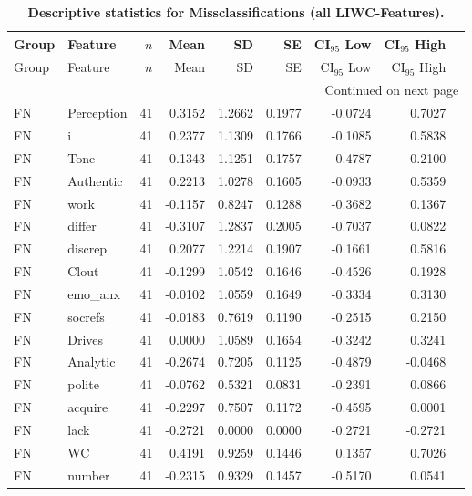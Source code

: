 
\begingroup
\scriptsize %
\setlength{\LTcapwidth}{\textwidth}
\setlength\LTleft{\fill}
\setlength\LTright{\fill}
\begin{longtable}{@{}llrrrrrrr@{}} 
\caption[Descriptive statistics for Missclassifications (all LIWC-Features)]{\textbf{Descriptive statistics for Missclassifications (all LIWC-Features).}} \label{tab:fnfp_all}\\
\toprule
Group & Feature & $n$ & Mean & SD & SE & CI$_{95}$ Low & CI$_{95}$ High \\
\midrule
\endfirsthead
\toprule
Group & Feature & $n$ & Mean & SD & SE & CI$_{95}$ Low & CI$_{95}$ High \\
\midrule
\endhead
\midrule
\multicolumn{9}{r}{{Continued on next page}} \\
\bottomrule
\endfoot
\bottomrule
\endlastfoot
FN & Perception & 41 & 0.3152 & 1.2662 & 0.1977 & -0.0724 & 0.7027 \\
FN & i & 41 & 0.2377 & 1.1309 & 0.1766 & -0.1085 & 0.5838 \\
FN & Tone & 41 & -0.1343 & 1.1251 & 0.1757 & -0.4787 & 0.2100 \\
FN & Authentic & 41 & 0.2213 & 1.0278 & 0.1605 & -0.0933 & 0.5359 \\
FN & work & 41 & -0.1157 & 0.8247 & 0.1288 & -0.3682 & 0.1367 \\
FN & differ & 41 & -0.3107 & 1.2837 & 0.2005 & -0.7037 & 0.0822 \\
FN & discrep & 41 & 0.2077 & 1.2214 & 0.1907 & -0.1661 & 0.5816 \\
FN & Clout & 41 & -0.1299 & 1.0542 & 0.1646 & -0.4526 & 0.1928 \\
FN & emo\_anx & 41 & -0.0102 & 1.0559 & 0.1649 & -0.3334 & 0.3130 \\
FN & socrefs & 41 & -0.0183 & 0.7619 & 0.1190 & -0.2515 & 0.2150 \\
FN & Drives & 41 & 0.0000 & 1.0589 & 0.1654 & -0.3242 & 0.3241 \\
FN & Analytic & 41 & -0.2674 & 0.7205 & 0.1125 & -0.4879 & -0.0468 \\
FN & polite & 41 & -0.0762 & 0.5321 & 0.0831 & -0.2391 & 0.0866 \\
FN & acquire & 41 & -0.2297 & 0.7507 & 0.1172 & -0.4595 & 0.0001 \\
FN & lack & 41 & -0.2721 & 0.0000 & 0.0000 & -0.2721 & -0.2721 \\
FN & WC & 41 & 0.4191 & 0.9259 & 0.1446 & 0.1357 & 0.7026 \\
FN & number & 41 & -0.2315 & 0.9329 & 0.1457 & -0.5170 & 0.0541 \\

\end{longtable}
